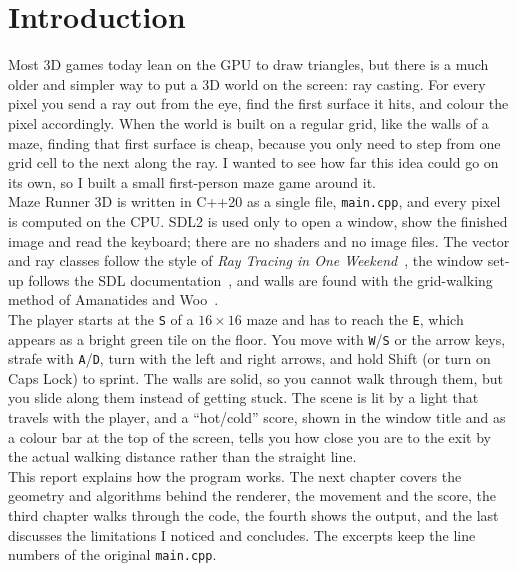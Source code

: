 \chapter{Introduction}

Most 3D games today lean on the GPU to draw triangles, but there is a much older and simpler way to put a 3D world on the screen: ray casting. For every pixel you send a ray out from the eye, find the first surface it hits, and colour the pixel accordingly. When the world is built on a regular grid, like the walls of a maze, finding that first surface is cheap, because you only need to step from one grid cell to the next along the ray. I wanted to see how far this idea could go on its own, so I built a small first-person maze game around it.
\\

Maze Runner 3D is written in C++20 as a single file, \texttt{main.cpp}, and every pixel is computed on the CPU. SDL2 is used only to open a window, show the finished image and read the keyboard; there are no shaders and no image files. The vector and ray classes follow the style of \emph{Ray Tracing in One Weekend}~\cite{shirley_rtiow}, the window set-up follows the SDL documentation~\cite{sdlwiki}, and walls are found with the grid-walking method of Amanatides and Woo~\cite{amanatides1987fast}.
\\

The player starts at the \texttt{S} of a $16\times16$ maze and has to reach the \texttt{E}, which appears as a bright green tile on the floor. You move with \texttt{W}/\texttt{S} or the arrow keys, strafe with \texttt{A}/\texttt{D}, turn with the left and right arrows, and hold Shift (or turn on Caps Lock) to sprint. The walls are solid, so you cannot walk through them, but you slide along them instead of getting stuck. The scene is lit by a light that travels with the player, and a ``hot/cold'' score, shown in the window title and as a colour bar at the top of the screen, tells you how close you are to the exit by the actual walking distance rather than the straight line.
\\

This report explains how the program works. The next chapter covers the geometry and algorithms behind the renderer, the movement and the score, the third chapter walks through the code, the fourth shows the output, and the last discusses the limitations I noticed and concludes. The excerpts keep the line numbers of the original \texttt{main.cpp}.
